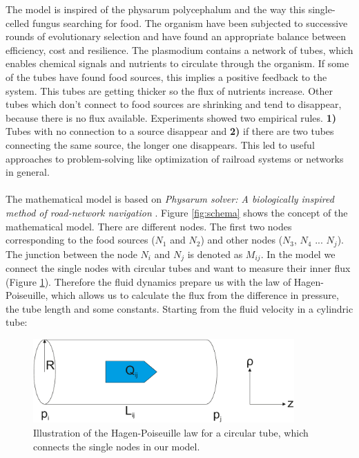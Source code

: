 \documentclass[11pt]{scrartcl}
\begin{document}
The model is inspired of the physarum polycephalum and the way this single-celled fungus searching for food. The organism have been subjected to successive rounds of evolutionary selection and have found an appropriate balance between efficiency, cost and resilience. The plasmodium contains a network of tubes, which enables chemical signals and nutrients to circulate through the organism. If some of the tubes have found food sources, this implies a positive feedback to the system. This tubes are getting thicker so the flux of nutrients increase. Other tubes which don't connect to food sources are shrinking and tend to disappear, because there is no flux available. Experiments showed two empirical rules. \textbf{1)} Tubes with no connection to a source disappear and \textbf{2)} if there are two tubes connecting the same source, the longer one disappears. This led to useful approaches to problem-solving like optimization of railroad systems or networks in general.~\\
~\\
The mathematical model is based on \textit{Physarum solver: A biologically inspired method of road-network navigation} \cite{network_model}. Figure \ref{fig:schema} shows the concept of the mathematical model. There are different nodes. The first two nodes corresponding to the food sources ($N_1$ and $N_2$) and other nodes ($N_3$, $N_4$ ... $N_j$). The junction between the node $N_i$ and $N_j$ is denoted as $M_{ij}$. In the model we connect the single nodes with circular tubes and want to measure their inner flux (Figure \ref{fig:fluidd}). Therefore the fluid dynamics prepare us with the law of Hagen-Poiseuille, which allows us to calculate the flux from the difference in pressure, the tube length and some constants. Starting from the fluid velocity in a cylindric tube:
\begin{figure}[H]
	\centering
	\includegraphics[width=10cm]{figures/figure2}
	\caption{Illustration of the Hagen-Poiseuille law for a circular tube, which connects the single nodes in our model.}
	\label{fig:fluidd}
\end{figure}
\end{document}
